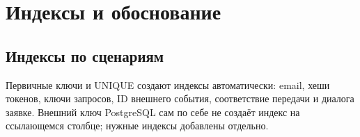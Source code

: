 \clearpage
\section{Индексы и обоснование}

\FloatBarrier
{}
\subsection{Индексы по сценариям}

Первичные ключи и UNIQUE создают индексы автоматически: email, хеши токенов, ключи запросов, ID внешнего события, соответствие передачи и диалога заявке. Внешний ключ Postgre\allowbreak{}SQL сам по себе не создаёт индекс на ссылающемся столбце; нужные индексы добавлены отдельно.

\begingroup
{}
\fontsize{11}{13}\selectfont
\setlength{\tablecontentwidth}{\dimexpr\linewidth-6\tabcolsep-4\arrayrulewidth\relax}
